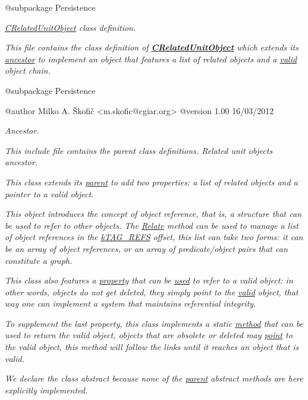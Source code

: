 {\itshape \begin{DoxyVerb} @subpackage        Persistence\end{DoxyVerb}
}

{\itshape {\itshape \hyperlink{class_c_related_unit_object}{C\-Related\-Unit\-Object}} class definition.}

{\itshape This file contains the class definition of {\bfseries \hyperlink{class_c_related_unit_object}{C\-Related\-Unit\-Object}} which extends its \hyperlink{class_c_persistent_unit_object}{ancestor} to implement an object that features a list of related objects and a \hyperlink{}{valid} object chain.}

{\itshape \begin{DoxyVerb} @subpackage        Persistence

 @author            Milko A. Škofič <m.skofic@cgiar.org>
 @version   1.00 16/03/2012\end{DoxyVerb}
}

{\itshape Ancestor.}

{\itshape This include file contains the parent class definitions. Related unit objects ancestor.}

{\itshape This class extends its \hyperlink{class_c_persistent_unit_object}{parent} to add two properties\-: a list of related objects and a pointer to a valid object.}

{\itshape This object introduces the concept of object reference, that is, a structure that can be used to refer to other objects. The \hyperlink{}{Relate} method can be used to manage a list of object references in the \hyperlink{}{k\-T\-A\-G\-\_\-\-R\-E\-F\-S} offset, this list can take two forms\-: it can be an array of object references, or an array of predicate/object pairs that can constitute a graph.}

{\itshape This class also features a \hyperlink{}{property} that can be \hyperlink{}{used} to refer to a valid object\-: in other words, objects do not get deleted, they simply point to the \hyperlink{}{valid} object, that way one can implement a system that maintains referential integrity.}

{\itshape To supplement the last property, this class implements a static \hyperlink{}{method} that can be used to return the valid object, objects that are obsolete or deleted may \hyperlink{}{point} to the valid object, this method will follow the links until it reaches an object that is valid.}

{\itshape We declare the class abstract because none of the \hyperlink{class_c_persistent_unit_object}{parent} abstract methods are here explicitly implemented.}

